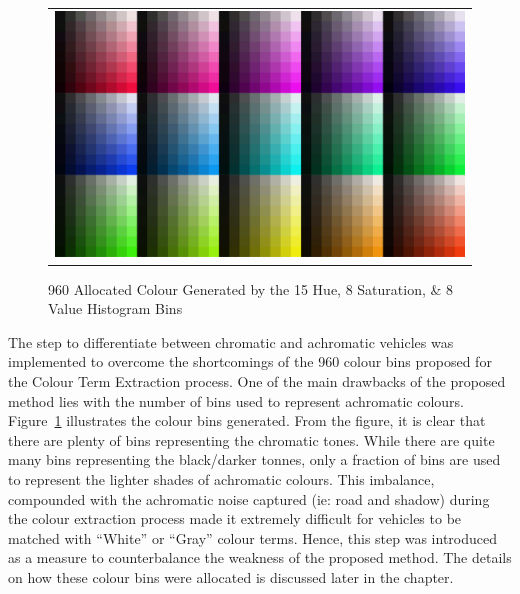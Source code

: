 \begin{figure}[htb!]
  \centering
\begin{tabular}{c}
 \includegraphics[width=0.7\linewidth]{image/retrievalOne/all.png} \\
\end{tabular}
    \caption{960 Allocated Colour Generated by the 15 Hue, 8 Saturation, \& 8 Value Histogram Bins} \label{fig:hsvAllocated}
\end{figure}

The step to differentiate between chromatic and achromatic vehicles was implemented to overcome the shortcomings of the 960 colour bins proposed for the Colour Term Extraction process.
One of the main drawbacks of the proposed method lies with the number of bins used to represent achromatic colours.
Figure~\ref{fig:hsvAllocated} illustrates the colour bins generated. From the figure, it is clear that there are plenty of bins representing the chromatic tones.
While there are quite many bins representing the black/darker tonnes, only a fraction of bins are used to represent the lighter shades of achromatic colours.
This imbalance, compounded with the achromatic noise captured (ie: road and shadow) during the colour extraction process made it extremely difficult for vehicles to be matched with ``White'' or ``Gray'' colour terms. Hence, this step was introduced as a measure to counterbalance the weakness of the proposed method.
The details on how these colour bins were allocated is discussed later in the chapter.

